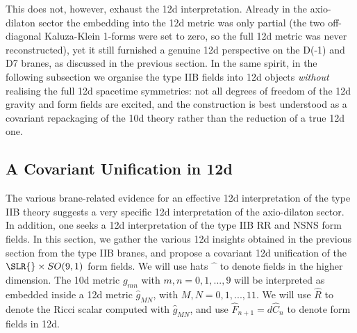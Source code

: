 This does not, however, exhaust the 12d interpretation.
Already in the axio-dilaton sector the embedding into the 12d metric was only partial (the two off-diagonal Kaluza-Klein 1-forms were set to zero, so the full 12d metric was never reconstructed), yet it still furnished a genuine 12d perspective on the D(-1) and D7 branes, as discussed in the previous section.
In the same spirit, in the following subsection we organise the type IIB fields into 12d objects \emph{without} realising the full 12d spacetime symmetries: not all degrees of freedom of the 12d gravity and form fields are excited, and the construction is best understood as a covariant repackaging of the 10d theory rather than the reduction of a true 12d one.

\subsection{A Covariant Unification in 12d}
\label{sec:a-covariant-unification-in-12d}

The various brane-related evidence for an effective 12d interpretation of the type IIB theory suggests a very specific 12d interpretation of the axio-dilaton sector.
In addition, one seeks a 12d interpretation of the type IIB RR and NSNS form fields.
In this section, we gather the various 12d insights obtained in the previous section from the type IIB branes, and propose a covariant 12d unification of the $\SLR{}\times SO(9,1)$ form fields.
We will use hats $\widehat{\phantom{x}}$ to denote fields in the higher dimension.
The 10d metric $g_{mn}$ with $m,n=0,1,...,9$ will be interpreted as embedded inside a 12d metric $\widehat{g}_{MN}$, with $M,N=0,1,...,11$. We will use $\widehat R$ to denote the Ricci scalar computed with $\widehat{g}_{MN}$, and use $\widehat{F}_{n+1} = d\widehat{C}_{n}$ to denote form fields in 12d.


